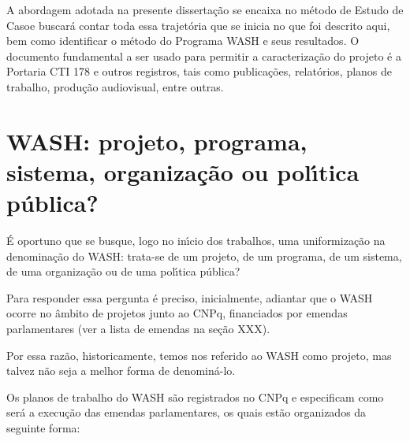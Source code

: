 \documentclass[
12pt,		%
openright,	%
twoside,  %
a4paper,			%
chapter=TITLE,		%
english,			%
french,				%
spanish,			%
brazil				%
]{USPSC-classe/USPSC}
\begin{document}
A abordagem adotada na presente disserta\c{c}\~ao se encaixa no m\'etodo de \textquotedbl Estudo de Caso\textquotedbl  e buscar\'a contar toda essa trajet\'oria que se inicia no que foi descrito aqui, bem como identificar o m\'etodo do Programa WASH e seus resultados. O documento fundamental a ser usado para permitir a caracteriza\c{c}\~ao do projeto \'e a Portaria CTI 178 e outros registros, tais como publica\c{c}\~oes, relat\'orios, planos de trabalho, produ\c{c}\~ao audiovisual, entre outras.










\section[WASH: projeto, programa, sistema, organiza\c{c}\~ao ou pol\'{\i}tica p\'ublica?]{WASH: projeto, programa, sistema, organiza\c{c}\~ao ou pol\'{\i}tica p\'ublica?}\label{WASH: projeto, programa, sistema, organiza\c{c}\~ao ou pol\'{\i}tica p\'ublica?}
\'E oportuno que se busque, logo no in\'{\i}cio dos trabalhos, uma uniformiza\c{c}\~ao na denomina\c{c}\~ao do WASH: trata-se de um projeto, de um programa, de um sistema, de uma organiza\c{c}\~ao ou de uma pol\'{\i}tica p\'ublica?










Para responder essa pergunta \'e preciso, inicialmente, adiantar que o WASH ocorre no \^ambito de projetos junto ao CNPq, financiados por emendas parlamentares (ver a lista de emendas na se\c{c}\~ao XXX).










Por essa raz\~ao, historicamente, temos nos referido ao WASH como projeto, mas talvez n\~ao seja a melhor forma de denomin\'a-lo.










Os planos de trabalho do WASH s\~ao registrados no CNPq e especificam como ser\'a a execu\c{c}\~ao das emendas parlamentares, os quais est\~ao organizados da seguinte forma:
\end{document}
